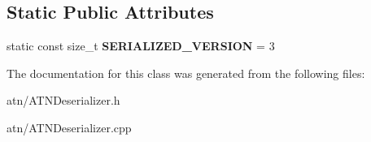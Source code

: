 \subsection*{Static Public Attributes}
\begin{DoxyCompactItemize}
\item 
\mbox{\label{classantlr4_1_1atn_1_1ATNDeserializer_a4160c21d7e3ee10c751a97ddad05697a}} 
static const size\+\_\+t {\bfseries S\+E\+R\+I\+A\+L\+I\+Z\+E\+D\+\_\+\+V\+E\+R\+S\+I\+ON} = 3
\end{DoxyCompactItemize}


The documentation for this class was generated from the following files\+:\begin{DoxyCompactItemize}
\item 
atn/A\+T\+N\+Deserializer.\+h\item 
atn/A\+T\+N\+Deserializer.\+cpp\end{DoxyCompactItemize}
